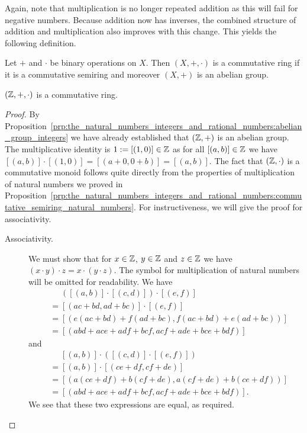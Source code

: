 \documentclass[../main.tex]{subfiles}
\begin{document}
Again, note that multiplication is no longer repeated addition as this will fail for negative numbers. Because addition now has inverses, the combined structure of addition and multiplication also improves with this change. This yields the following definition.
\begin{definition}
    Let $+$ and $\cdot$ be binary operations on $X$. Then $(X,+,\cdot)$ is a commutative ring if it is a commutative semiring and moreover $(X,+)$ is an abelian group.
\end{definition}
\begin{proposition}\label{prp:the_natural_numbers_integers_and_rational_numbers:commutative_ring_integers}
    $(\mathbb{Z},+,\cdot)$ is a commutative ring.
\end{proposition}
\begin{proof}
    By Proposition~\ref{prp:the_natural_numbers_integers_and_rational_numbers:abelian_group_integers} we have already established that $(\mathbb{Z},+)$ is an abelian group. The multiplicative identity is $1:=[(1,0)]\in\mathbb{Z}$ as for all $[(a,b)]\in\mathbb{Z}$ we have $[(a,b)]\cdot[(1,0)]=[(a+0,0+b)]=[(a,b)]$. The fact that $(\mathbb{Z},\cdot)$ is a commutative monoid follows quite directly from the properties of multiplication of natural numbers we proved in Proposition~\ref{prp:the_natural_numbers_integers_and_rational_numbers:commutative_semiring_natural_numbers}. For instructiveness, we will give the proof for associativity.
    \begin{description}
        \item[Associativity.] We must show that for $x\in\mathbb{Z}$, $y\in\mathbb{Z}$ and $z\in\mathbb{Z}$ we have $(x\cdot y)\cdot z=x\cdot(y\cdot z)$. The symbol for multiplication of natural numbers will be omitted for readability. We have
        \begin{align*}
            & \phantom{{}={}}([(a,b)]\cdot[(c,d)])\cdot[(e,f)] \\
            & =[(ac+bd,ad+bc)]\cdot[(e,f)] \\
            & =[(e(ac+bd)+f(ad+bc),f(ac+bd)+e(ad+bc))] \\
            & =[(abd+ace+adf+bcf,acf+ade+bce+bdf)]
        \end{align*}
        and
        \begin{align*}
            & \phantom{{}={}}[(a,b)]\cdot([(c,d)]\cdot[(e,f)]) \\
            & =[(a,b)]\cdot[(ce+df,cf+de)] \\
            & =[(a(ce+df)+b(cf+de),a(cf+de)+b(ce+df))] \\
            & =[(abd+ace+adf+bcf,acf+ade+bce+bdf)].
        \end{align*}
        We see that these two expressions are equal, as required.
    \end{description}
\end{proof}
\end{document}
